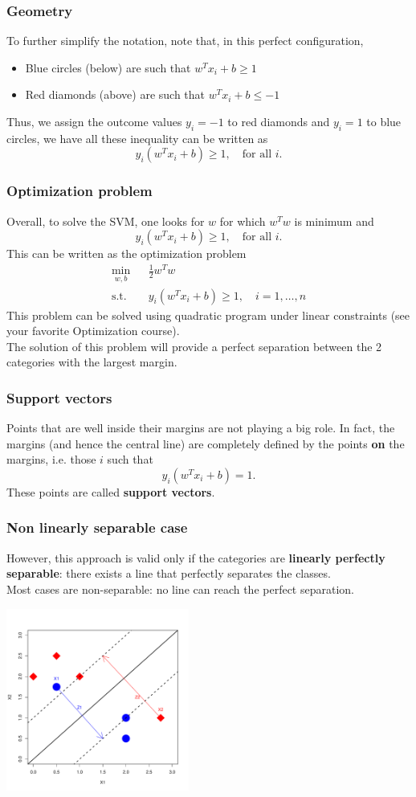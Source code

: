 \begin{frame}
\frametitle{Geometry}
To further simplify the notation, note that, in this perfect configuration, 
\begin{itemize}
\item Blue circles (below) are such that $w^T x_i + b \geq 1$
\item Red diamonds (above) are such that $w^T x_i + b \leq -1$
\end{itemize}
Thus, we assign the outcome values $y_i=-1$ to red diamonds and $y_i=1$ to blue circles, we have all these inequality can be written as
$$
y_i (w^T x_i + b) \geq 1, \quad \mbox{for all } i.
$$
\end{frame}
\begin{frame}
\frametitle{Optimization problem}
Overall, to solve the SVM, one looks for $w$ for which $w^Tw$ is minimum and 
$$
y_i (w^T x_i + b) \geq 1, \quad \mbox{for all } i.
$$
This can be written as the optimization problem
\begin{eqnarray*}
\min_{w, b} && \frac{1}{2}w^Tw  \\
\mbox{s.t. } && y_i(w^Tx_i + b) \geq 1, \quad i=1,\ldots ,n
\end{eqnarray*}
This problem can be solved using quadratic program under linear constraints (see your favorite Optimization course).\\
\vspace{0.2cm}
The solution of this problem will provide a perfect separation between the 2 categories with the largest margin.
\end{frame}
\begin{frame}
\frametitle{Support vectors}
Points that are well inside their margins are not playing a big role. In fact, the margins (and hence the central line) are completely defined by the points {\bf on} the margins, i.e. those $i$ such that
$$
y_i(w^T x_i + b) = 1.
$$ 
These points are called {\bf support vectors}.
\end{frame}
\begin{frame}
\frametitle{Non linearly separable case}
However, this approach is valid only if the categories are {\bf linearly perfectly separable}: there exists a line that perfectly separates the classes.\\
\vspace{0.3cm}
Most cases are non-separable: no line can reach the perfect separation.
\begin{center}
\includegraphics[width=6cm]{../../Graphs/SVM_SoftMargins.pdf}
\end{center}
\end{frame}
